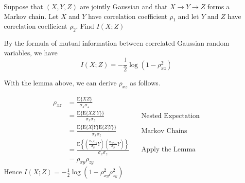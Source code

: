 \begin{exercise}{Suppose that $(X, Y, Z)$ are jointly Gaussian and that $X \rightarrow Y \rightarrow Z$ forms a Markov chain. Let $X$ and $Y$ have correlation coefficient $\rho_{1}$ and let $Y$ and $Z$ have correlation coefficient $\rho_{2} .$ Find $I(X ; Z)$}
  \begin{solution} By the formula of mutual information between correlated Gaussian random variables, we have
    \begin{equation}
      I(X;Z) = -\frac{1}{2} \log (1-\rho_{xz} ^2)
    \end{equation}

  With the lemma above, we can derive $\rho_{xz}$ as follows.

  \begin{equation}
      \begin{aligned}
      \rho_{x z} &=\frac{\mathrm{E}\{X Z\}}{\sigma_{x} \sigma_{z}} \\
      &=\frac{\mathrm{E}\{\mathrm{E}\{X Z | Y\}\}}{\sigma_{x} \sigma_{z}} &\quad {\text{Nested Expectation}} \\
      &=\frac{\mathrm{E}\{\mathrm{E}\{X | Y\} \mathrm{E}\{Z | Y\}\}}{\sigma_{x} \sigma_{z}} &\quad {\text{Markov Chains}}\\
      &=\frac{\mathrm{E}\left\{\left(\frac{\sigma_{x} \rho_{x y}}{\sigma_{y}} Y\right)\left(\frac{\sigma_{z} \rho_{z x}}{\sigma_{y}} Y\right)\right\}}{\sigma_{x} \sigma_{z}} &\quad {\text{Apply the Lemma}} \\
      &=\rho_{x y} \rho_{z y}
      \end{aligned}
  \end{equation}
  Hence $I(X;Z) = -\frac{1}{2} \log (1 -\rho_{x y}^2 \rho_{z y}^2 )$
  \end{solution}
  \label{ex5}
\end{exercise}